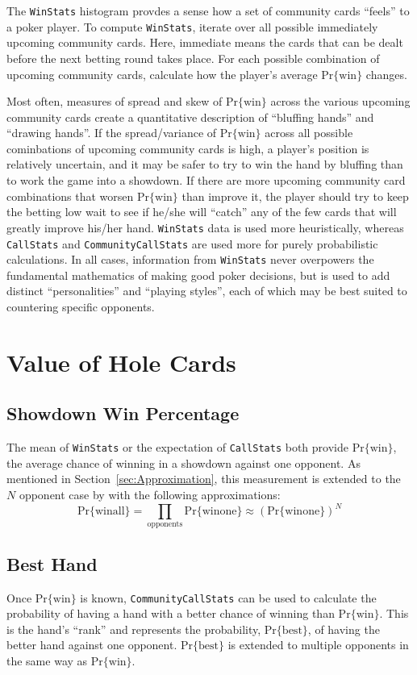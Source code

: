 The \texttt{WinStats} histogram provdes a sense how a set of community cards ``feels'' to a poker player.
To compute \texttt{WinStats}, iterate over all possible immediately upcoming community cards.
Here, immediate means the cards that can be dealt before the next betting round takes place.
For each possible combination of upcoming community cards, calculate how the player's average $\mathrm{Pr\{win\}}$ changes.

Most often, measures of spread and skew of $\mathrm{Pr\{win\}}$ across the various upcoming community cards create a quantitative description of ``bluffing hands'' and ``drawing hands''.
If the spread/variance of $\mathrm{Pr\{win\}}$ across all possible cominbations of upcoming community cards is high, a player's position is relatively uncertain, and it may be safer to try to win the hand by bluffing than to work the game into a showdown.
If there are more upcoming community card combinations that worsen $\mathrm{Pr\{win\}}$ than improve it, the player should try to keep the betting low wait to see if he/she will ``catch'' any of the few cards that will greatly improve his/her hand.
\texttt{WinStats} data is used more heuristically, whereas \texttt{CallStats} and \texttt{CommunityCallStats} are used more for purely probabilistic calculations.
In all cases, information from \texttt{WinStats} never overpowers the fundamental mathematics of making good poker decisions, but is used to add distinct ``personalities'' and ``playing styles'', each of which may be best suited to countering specific opponents.


\section{Value of Hole Cards}

\subsection{Showdown Win Percentage}
\label{sec:Mean}
The mean of \texttt{WinStats} or the expectation of \texttt{CallStats} both provide $\mathrm{Pr\{win\}}$, the average chance of winning in a showdown against one opponent.
As mentioned in Section~\ref{sec:Approximation}, this measurement is extended to the $N$ opponent case by with the following approximations:
\[
\mathrm{Pr\{win all\}} = \prod_\mathrm{opponents} \mathrm{Pr\{win one\}} \approx \left( \mathrm{Pr\{win one\}} \right)^N
\]


\subsection{Best Hand}
\label{sec:Rank}
Once $\mathrm{Pr\{win\}}$ is known, \texttt{CommunityCallStats} can be used to calculate the probability of having a hand with a better chance of winning than $\mathrm{Pr\{win\}}$.
This is the hand's ``rank'' and represents the probability, $\mathrm{Pr\{best\}}$, of having the better hand against one opponent.
$\mathrm{Pr\{best\}}$ is extended to multiple opponents in the same way as $\mathrm{Pr\{win\}}$.


